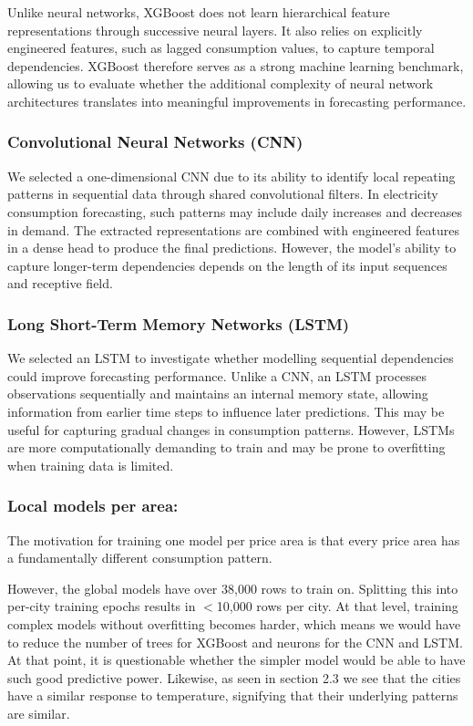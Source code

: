\documentclass[11pt,a4paper]{article}
\begin{document}
Unlike neural networks, XGBoost does not learn hierarchical feature representations through successive neural layers. It also relies on explicitly engineered features, such as lagged consumption values, to capture temporal dependencies. XGBoost therefore serves as a strong machine learning benchmark, allowing us to evaluate whether the additional complexity of neural network architectures translates into meaningful improvements in forecasting performance.

\subsubsection{Convolutional Neural Networks (CNN)}
We selected a one-dimensional CNN due to its ability to identify local repeating patterns in sequential data through shared convolutional filters. In electricity consumption forecasting, such patterns may include daily increases and decreases in demand. The extracted representations are combined with engineered features in a dense head to produce the final predictions. However, the model's ability to capture longer-term dependencies depends on the length of its input sequences and receptive field.

\subsubsection{Long Short-Term Memory Networks (LSTM)}
We selected an LSTM to investigate whether modelling sequential dependencies could improve forecasting performance. Unlike a CNN, an LSTM processes observations sequentially and maintains an internal memory state, allowing information from earlier time steps to influence later predictions. This may be useful for capturing gradual changes in consumption patterns. However, LSTMs are more computationally demanding to train and may be prone to overfitting when training data is limited.

\subsubsection{Local models per area:}
The motivation for training one model per price area is that every price area has a fundamentally different consumption pattern.

However, the global models have over 38,000 rows to train on. Splitting this into per-city training epochs results in $<$10,000 rows per city. At that level, training complex models without overfitting becomes harder, which means we would have to reduce the number of trees for XGBoost and neurons for the CNN and LSTM. At that point, it is questionable whether the simpler model would be able to have such good predictive power. Likewise, as seen in section 2.3 we see that the cities have a similar response to temperature, signifying that their underlying patterns are similar.
\end{document}
